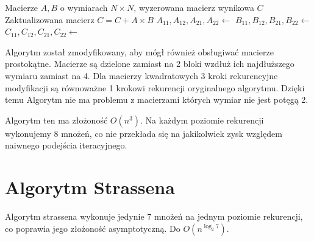 \documentclass[twoside]{article}
\begin{document}
\begin{algorithm}[H]
\caption{Rekurencyjny algorytm mnożenia macierzy (Binet / Dziel i Zwyciężaj)}
\label{alg:binet}
\begin{algorithmic}[1]
\Require Macierze $A, B$ o wymiarach $N \times N$, wyzerowana macierz wynikowa $C$
\Ensure Zaktualizowana macierz $C = C + A \times B$
        \State {} 
        \State \Return
    \EndIf
    \State $A_{11}, A_{12}, A_{21}, A_{22} \gets $
    \State $B_{11}, B_{12}, B_{21}, B_{22} \gets $
    \State $C_{11}, C_{12}, C_{21}, C_{22} \gets $
    
    \State {}
    \State {}
    
    \State {}
    \State {}
    
    \State {}
    \State {}
    
    \State {}
    \State {}
\EndFunction
\end{algorithmic}
\end{algorithm}

Algorytm został zmodyfikowany, aby mógł również obsługiwać macierze prostokątne. Macierze są dzielone zamiast na 2 bloki wzdłuż ich najdłuższego wymiaru zamiast
na 4. Dla macierzy kwadratowych 3 kroki rekurencyjne modyfikacji są równoważne 1 krokowi rekurencji oryginalnego algorytmu. Dzięki temu Algorytm nie ma
problemu z macierzami których wymiar nie jest potęgą 2.

Algorytm ten ma złożoność \(O(n^3)\). Na każdym poziomie rekurencji wykonujemy 8 mnożeń, co nie przekłada się na jakikolwiek zysk względem naiwnego podejścia
iteracyjnego.


\section{Algorytm Strassena}
Algorytm strassena wykonuje jedynie 7 mnożeń na jednym poziomie rekurencji, co poprawia jego złożoność asymptotyczną. Do $O(n^{\log_{2}7})$.
\end{document}
